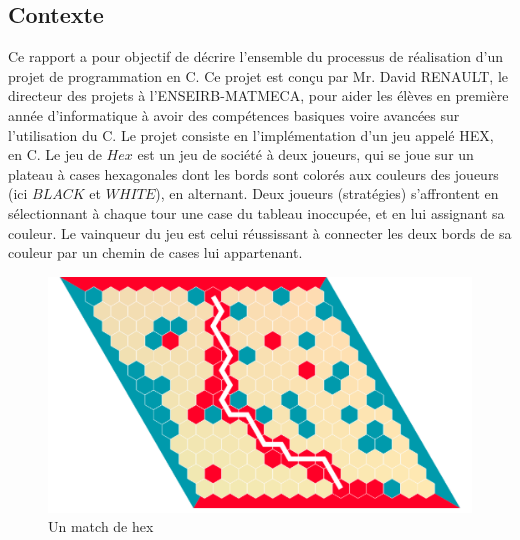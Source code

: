 \documentclass{article}
\begin{document}
    \subsection*{Contexte}
    Ce rapport a pour objectif de décrire l’ensemble du processus de réalisation d'un projet de programmation en C. Ce projet est conçu par Mr. David RENAULT, le directeur des projets à l'ENSEIRB-MATMECA, pour aider les élèves en première année d’informatique à avoir des compétences basiques voire avancées sur l'utilisation du C. Le projet consiste en l’implémentation d'un jeu appelé HEX, en C.
    Le jeu de $Hex$ est un jeu de société à deux joueurs, qui se joue sur un plateau à cases hexagonales dont les bords sont colorés aux couleurs des joueurs (ici $BLACK$ et $WHITE$), en alternant. Deux joueurs (stratégies) s'affrontent en sélectionnant à chaque tour une case du tableau inoccupée, et en lui assignant sa couleur. Le vainqueur du jeu est celui réussissant à connecter les deux bords de sa couleur par un chemin de cases lui appartenant.\\
    \begin{figure}[h]
        \centering
        \includegraphics{hexgame.png}
        \caption{Un match de hex}
        \label{fig:hexgame}
    \end{figure}
\end{document}
